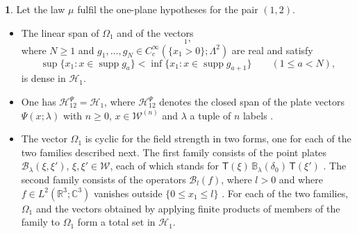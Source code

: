 \documentclass[11pt]{amsart}
\newcommand{\namedhead}{}
\theoremstyle{definition}
\newtheorem*{namedinner}{\namedhead}
\newenvironment{named}[1]{\renewcommand{\namedhead}{#1}\begin{namedinner}}{\end{namedinner}}
\begin{document}
\begin{named}{Theorem 2.1}
Let the law $\mu$ fulfil the one-plane hypotheses for the pair $(1,2)$.
\begin{itemize}
\item[(a)] The linear span of $\Omega_1$ and of the vectors
\begin{equation*}
[X(g_1)\cdots X(g_N)]_1,
\end{equation*}
where $N\ge1$ and $g_1,\dots,g_N\in C_c^\infty(\{x_1>0\};\Lambda^2)$ are real and satisfy
\begin{equation*}
\sup\{x_1:x\in\operatorname{supp}g_a\}<\inf\{x_1:x\in\operatorname{supp}g_{a+1}\}\qquad(1\le a<N),
\end{equation*}
is dense in $\mathcal H_1$.
\item[(b)] One has $\mathcal H^{\Psi}_{12}=\mathcal H_1$, where $\mathcal H^{\Psi}_{12}$ denotes the closed span of the plate vectors $\Psi(x;\lambda)$ with $n\ge0$, $x\in\mathcal W^{(n)}$ and $\lambda$ a tuple of $n$ labels \cite[Definition~14.21; Proposition~14.47\,(c)]{QEDII}.
\item[(c)] The vector $\Omega_1$ is cyclic for the field strength in two forms, one for each of the two families described next.
The first family consists of the point plates $\mathcal B_\lambda(\xi,\xi')$, $\xi,\xi'\in\mathcal W$, each of which stands for $\mathsf T(\xi)\,\mathbb B_\lambda(\delta_0)\,\mathsf T(\xi')$ \cite[Proposition~14.18]{QEDII}.
The second family consists of the operators $\mathcal B_l(f)$, where $l>0$ and where $f\in L^2(\mathbb R^3;\mathbb C^3)$ vanishes outside $\{0\le x_1\le l\}$ \cite[Proposition~14.16]{QEDII}.
For each of the two families, $\Omega_1$ and the vectors obtained by applying finite products of members of the family to $\Omega_1$ form a total set in $\mathcal H_1$.
\end{itemize}
\end{named}
\end{document}
